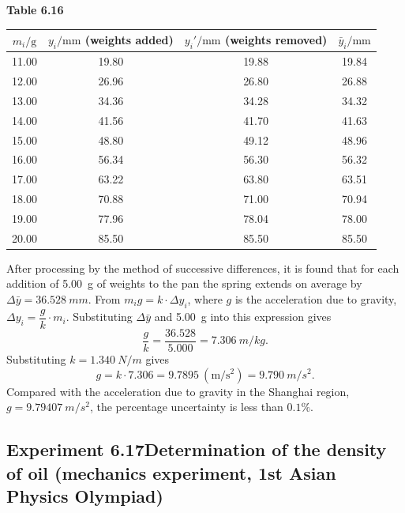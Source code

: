 \begin{center}
\begin{minipage}{\linewidth}
\centering
\textbf{Table 6.16}\\[3pt]
\begin{tabular}{cccc}
\toprule
$m_i/\mathrm{g}$ & $y_i/\mathrm{mm}$ (weights added) & $y_i'/\mathrm{mm}$ (weights removed) & $\bar y_i/\mathrm{mm}$\\
\midrule
11.00 & 19.80 & 19.88 & 19.84\\
12.00 & 26.96 & 26.80 & 26.88\\
13.00 & 34.36 & 34.28 & 34.32\\
14.00 & 41.56 & 41.70 & 41.63\\
15.00 & 48.80 & 49.12 & 48.96\\
16.00 & 56.34 & 56.30 & 56.32\\
17.00 & 63.22 & 63.80 & 63.51\\
18.00 & 70.88 & 71.00 & 70.94\\
19.00 & 77.96 & 78.04 & 78.00\\
20.00 & 85.50 & 85.50 & 85.50\\
\bottomrule
\end{tabular}
\end{minipage}
\end{center}

\noindent After processing by the method of successive differences, it is found that for each addition of \SI{5.00}{g} of weights to the pan the spring extends on average by $\Delta\bar y=\SI{36.528}{mm}$. From $m_i g=k\cdot\Delta y_i$, where $g$ is the acceleration due to gravity, $\Delta y_i=\dfrac{g}{k}\cdot m_i$. Substituting $\Delta\bar y$ and \SI{5.00}{g} into this expression gives
\begin{equation*}
\frac{g}{k}=\frac{36.528}{5.000}=\SI{7.306}{m/kg}.
\end{equation*}
Substituting $k=\SI{1.340}{N/m}$ gives
\begin{equation*}
g=k\cdot 7.306=9.7895\ (\mathrm{m/s^2})=\SI{9.790}{m/s^2}.
\end{equation*}
Compared with the acceleration due to gravity in the Shanghai region, $g=\SI{9.79407}{m/s^2}$, the percentage uncertainty is less than $0.1\%$.

\subsection*{Experiment 6.17\quad Determination of the density of oil (mechanics experiment, 1st Asian Physics Olympiad)}

